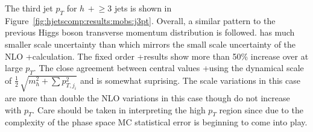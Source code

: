 The third jet $p_T$ for $h\,+\!\ge\!\!3$ jets is shown in
Figure~\ref{fig:hjetscomp:results:mobs:j3pt}. Overall, a similar pattern to the
previous Higgs boson transverse momentum distribution is followed. \Sherpa
\MEPSatNLO has much smaller scale uncertainty than \MGaMC which mirrors 
the small scale uncertainty of the NLO \GoSam{}+\Sherpa calculation. The fixed
order \GoSam{}+\Sherpa results show more than 50\% increase over \Powheg at large
$p_T$.  The close agreement between central values \GoSam{}+\Sherpa using the
dynamical scale of $\tfrac{1}{2}\,\sqrt{m_{h}^2+\sum p_{T,j_i}^2}$ and \Minlo
is somewhat suprising. The \Minlo scale variations in this case are more than
double the NLO variations in this case though do not increase with $p_T$. Care
should be taken in interpreting the high $p_T$ region since due to the
complexity of the phase space MC statistical error is beginning to come into
play.


